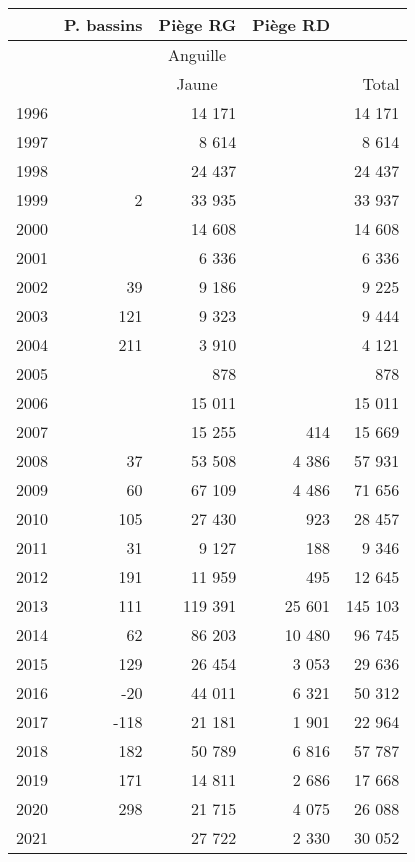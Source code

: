 \begin{table}[ht]
\centering
\begin{tabular}{lrrrr}
  \hline
   & \multicolumn{1}{c}{P. bassins} & \multicolumn{1}{c}{Piège RG} & \multicolumn{1}{c}{Piège RD} & \\
 \hline
  & \multicolumn{3}{c}{Anguille} & \\
 \hline
  & \multicolumn{3}{c}{Jaune} & Total\\
 \hline
1996 &  & 14 171 &  & 14 171 \\ 
  1997 &  & 8 614 &  & 8 614 \\ 
  1998 &  & 24 437 &  & 24 437 \\ 
  1999 & 2 & 33 935 &  & 33 937 \\ 
  2000 &  & 14 608 &  & 14 608 \\ 
  2001 &  & 6 336 &  & 6 336 \\ 
  2002 & 39 & 9 186 &  & 9 225 \\ 
  2003 & 121 & 9 323 &  & 9 444 \\ 
  2004 & 211 & 3 910 &  & 4 121 \\ 
  2005 &  & 878 &  & 878 \\ 
  2006 &  & 15 011 &  & 15 011 \\ 
  2007 &  & 15 255 & 414 & 15 669 \\ 
  2008 & 37 & 53 508 & 4 386 & 57 931 \\ 
  2009 & 60 & 67 109 & 4 486 & 71 656 \\ 
  2010 & 105 & 27 430 & 923 & 28 457 \\ 
  2011 & 31 & 9 127 & 188 & 9 346 \\ 
  2012 & 191 & 11 959 & 495 & 12 645 \\ 
  2013 & 111 & 119 391 & 25 601 & 145 103 \\ 
  2014 & 62 & 86 203 & 10 480 & 96 745 \\ 
  2015 & 129 & 26 454 & 3 053 & 29 636 \\ 
  2016 & -20 & 44 011 & 6 321 & 50 312 \\ 
  2017 & -118 & 21 181 & 1 901 & 22 964 \\ 
  2018 & 182 & 50 789 & 6 816 & 57 787 \\ 
  2019 & 171 & 14 811 & 2 686 & 17 668 \\ 
  2020 & 298 & 21 715 & 4 075 & 26 088 \\ 
  2021 &  & 27 722 & 2 330 & 30 052 \\ 
   \hline

\end{tabular}
\end{table}
